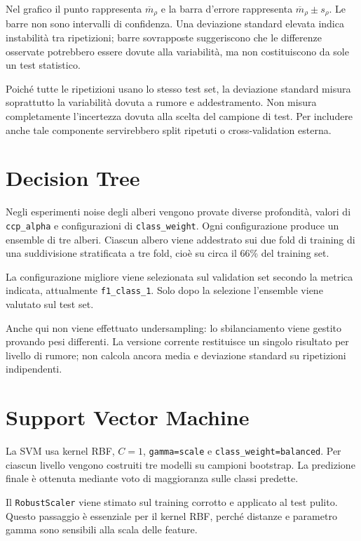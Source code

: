 \documentclass[11pt,a4paper]{article}
\begin{document}
Nel grafico il punto rappresenta $\overline{m}_{\rho}$ e la barra d'errore rappresenta $\overline{m}_{\rho}\pm s_{\rho}$. Le barre non sono intervalli di confidenza. Una deviazione standard elevata indica instabilità tra ripetizioni; barre sovrapposte suggeriscono che le differenze osservate potrebbero essere dovute alla variabilità, ma non costituiscono da sole un test statistico.

Poiché tutte le ripetizioni usano lo stesso test set, la deviazione standard misura soprattutto la variabilità dovuta a rumore e addestramento. Non misura completamente l'incertezza dovuta alla scelta del campione di test. Per includere anche tale componente servirebbero split ripetuti o cross-validation esterna.

\section{Decision Tree}

Negli esperimenti noise degli alberi vengono provate diverse profondità, valori di \texttt{ccp\_alpha} e configurazioni di \texttt{class\_weight}. Ogni configurazione produce un ensemble di tre alberi. Ciascun albero viene addestrato sui due fold di training di una suddivisione stratificata a tre fold, cioè su circa il 66\% del training set.

La configurazione migliore viene selezionata sul validation set secondo la metrica indicata, attualmente \texttt{f1\_class\_1}. Solo dopo la selezione l'ensemble viene valutato sul test set.

Anche qui non viene effettuato undersampling: lo sbilanciamento viene gestito provando pesi differenti. La versione corrente restituisce un singolo risultato per livello di rumore; non calcola ancora media e deviazione standard su ripetizioni indipendenti.

\section{Support Vector Machine}

La SVM usa kernel RBF, $C=1$, \texttt{gamma=scale} e \texttt{class\_weight=balanced}. Per ciascun livello vengono costruiti tre modelli su campioni bootstrap. La predizione finale è ottenuta mediante voto di maggioranza sulle classi predette.

Il \texttt{RobustScaler} viene stimato sul training corrotto e applicato al test pulito. Questo passaggio è essenziale per il kernel RBF, perché distanze e parametro gamma sono sensibili alla scala delle feature.
\end{document}

